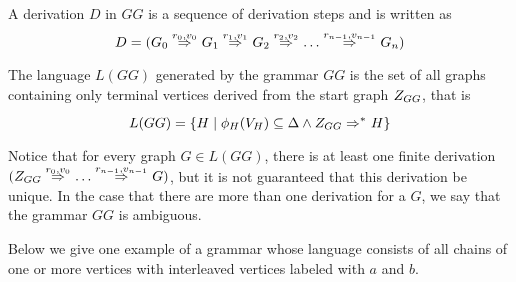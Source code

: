 \documentclass[]{report}
\begin{document}

\begin{definition}
	A derivation $D$ in $GG$ is a sequence of derivation steps and is written as
	\[ 
		D = (G_0 \deriv{r_0}{v_0}{} G_1 \deriv{r_1}{v_1}{} G_2 \deriv{r_2}{v_2}{} \dots \deriv{r_{n-1}}{v_{n-1}}{} G_n)
	\]
\end{definition}

\begin{definition}
	The language $L(GG)$ generated by the grammar $GG$ is the set of all graphs containing only terminal vertices derived from the start graph $Z_{GG}$, that is
	\[
		L(GG) = \{H \st \phi_H(V_H) \subseteq \Delta \land \startG{GG} \derivtr{}{}{} H\}
	\]
\end{definition}


Notice that for every graph $G \in L(GG)$, there is at least one finite derivation $(\startG{GG} \deriv{r_0}{v_0}{} \dots \deriv{r_{n-1}}{v_{n-1}}{} G)$, but it is not guaranteed that this derivation be unique. In the case that there are more than one derivation for a $G$, we say that the grammar $GG$ is ambiguous. 

Below we give one example of a grammar whose language consists of all chains of one or more vertices with interleaved vertices labeled with $a$ and $b$.


\end{document}
